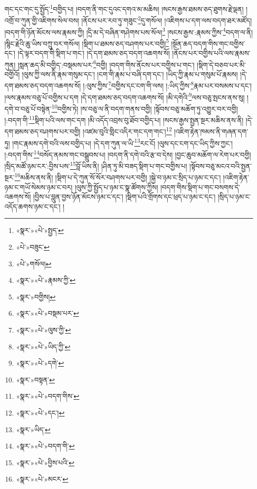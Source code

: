 གང་དང་གང་དུ་སྤྱོད་\footnote{«སྣར་»«པེ་»སྤྱད་}བགྱིད་པ། །བདག་ནི་གང་དུའང་དགའ་མ་མཆིས། །སངས་རྒྱས་ཐམས་ཅད་ཐུགས་རྗེ་ལྡན། །འགྲོ་བ་ཀུན་གྱི་འཇིགས་སེལ་བས། །ནོངས་པར་རབ་ཏུ་གཟུང་\footnote{«པེ་»བཟུང་}དུ་གསོལ། །འཇིགས་པ་དག་ལས་བདག་ཐར་མཛོད། །བདག་གི་ཉོན་མོངས་ལས་རྣམས་ཀྱི། །དྲི་མ་དེ་བཞིན་གཤེགས་པས་སོལ།\footnote{«པེ་»གསོལ།} །སངས་རྒྱས་:རྣམས་ཀྱིས་\footnote{«སྣར་»«པེ་»རྣམས་ཀྱི་}བདག་ལ་ནི། །སྙིང་རྗེའི་ཆུ་ཡིས་བཀྲུ་བར་གསོལ། །སྡིག་པ་ཐམས་ཅད་བཤགས་པར་བགྱི།\footnote{«སྣར་»བགྱིས།} །སྔོན་ཆད་བདག་གིས་གང་བགྱིས་དང་། །དེ་ལྟར་བདག་གི་སྡིག་པ་གང་། །དེ་དག་ཐམས་ཅད་བདག་འཆགས་སོ། །ནོངས་པར་བགྱིས་པའི་ལས་རྣམས་ཀུན། །སླན་ཆད་མི་བགྱིད་:བསྡམས་པར་\footnote{«སྣར་»«པེ་»བསྡམ་པར་}བགྱི། །བདག་གིས་ནོངས་པར་བགྱིས་པ་གང་། །སྡིག་དེ་བཅབ་པར་མི་བགྱིའོ། །ལུས་ཀྱི་ལས་ནི་རྣམ་གསུམ་དང་། །ངག་གི་རྣམ་པ་བཞི་དག་དང་། །ཡིད་ཀྱི་རྣམ་པ་གསུམ་པོ་རྣམས། །དེ་དག་ཐམས་ཅད་བདག་འཆགས་སོ། །:ལུས་ཀྱིས་\footnote{«སྣར་»«པེ་»ལུས་ཀྱི་}བགྱིས་དང་ངག་གི་ལས། །:ཡིད་ཀྱིས་\footnote{«སྣར་»«པེ་»ཡིད་ཀྱི་}རྣམ་པར་བསམས་པ་དང་། །ལས་རྣམས་བཅུ་པོ་བགྱིས་པ་དག །དེ་དག་ཐམས་ཅད་བདག་འཆགས་སོ། །མི་དགེའི་\footnote{«སྣར་»«པེ་»དགེ་}ལས་བཅུ་སྤངས་ནས་སུ། །དགེ་བ་བཅུ་པོ་བསྟེན་\footnote{«སྣར་»བསྟན་}བགྱིས་ཏེ། །ས་བཅུ་ལ་ནི་བདག་གནས་བགྱི། །སྟོབས་བཅུ་མཆོག་ཏུ་འགྱུར་བར་བགྱི། །:བདག་གི་\footnote{«སྣར་»«པེ་»བདག་གིས་}སྡིག་པའི་ལས་གང་དག །མི་འདོད་འབྲས་བུ་ཐོབ་བགྱིད་པ། །སངས་རྒྱས་སྤྱན་སྔར་མཆིས་ནས་ནི། །དེ་དག་ཐམས་ཅད་བཤགས་པར་བགྱི། །འཛམ་བུའི་གླིང་འདིར་གང་དག་གང་།\footnote{«སྣར་»«པེ་»དང་།} །འཇིག་རྟེན་ཁམས་ནི་གཞན་དག་ཏུ། །གང་རྣམས་དགེ་བའི་ལས་བགྱིད་པ། །དེ་དག་ཀུན་ལ་ཡི་\footnote{«སྣར་»ཡིད་}རང་ངོ། །ལུས་དང་ངག་དང་ཡིད་ཀྱིས་ཀྱང་། །:བདག་གིས་\footnote{«སྣར་»«པེ་»བདག་གི་}བསོད་ནམས་གང་བསྒྲུབས་པ། །བདག་ནི་དགེ་བའི་རྩ་བ་དེས། །བྱང་ཆུབ་མཆོག་ལ་རེག་པར་བགྱི། །སྲིད་མཚོ་ཉམ་ངར་:བྱིས་པས་\footnote{«སྣར་»«པེ་»བྱིས་པའི་}བློ་ཡིས་ནི། །ཤིན་ཏུ་མི་བཟད་སྡིག་པ་གང་བགྱིས་པ། །སྟོབས་བཅུ་མངའ་བའི་སྤྱན་སྔར་\footnote{«སྣར་»«པེ་»མངར་}མཆིས་ནས་ནི། །སྡིག་པ་དེ་ཀུན་སོ་སོར་བཤགས་པར་བགྱི། །སྐྱེ་བ་ཉམ་ང་སྲིད་པ་ཉམ་ང་དང་། །འཇིག་རྟེན་ཉམ་ང་གཡོ་སེམས་ཉམ་ང་བར། །ལུས་ཀྱི་སྤྱོད་པ་ཉམ་ང་སྣ་ཚོགས་ཀྱིས། །བདག་གིས་སྡིག་པ་གང་བསགས་དེ་འཆགས་སོ། །བྱིས་པ་བླུན་བྱས་ཉོན་མོངས་ཉམ་ང་དང་། །སྡིག་པའི་གྲོགས་དང་ཕྲད་པ་ཉམ་ང་དང་། །སྲིད་པ་ཉམ་ང་འདོད་ཆགས་ཉམ་ང་དང་། །
